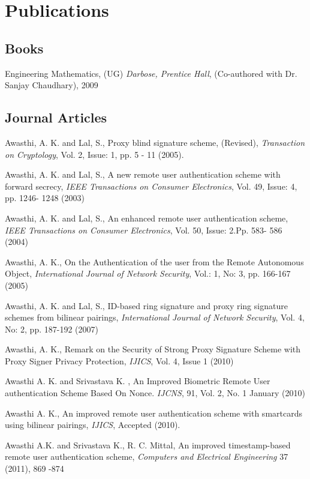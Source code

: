 \documentclass[letterpaper]{article}
\renewenvironment{itemize}{
  \begin{list}{}{
    \setlength{\leftmargin}{1.5em}
  }
}{
  \end{list}
}
\begin{document}
\section*{Publications}
\subsection*{Books}
\begin{itemize}
\item Engineering Mathematics, (UG) \emph{Darbose, Prentice Hall}, (Co-authored with Dr. Sanjay Chaudhary), 2009
\end{itemize}

\subsection*{Journal Articles}

\begin{itemize}
\item Awasthi, A. K. and Lal, S., Proxy blind signature scheme, (Revised), \emph{Transaction 
               on Cryptology}, Vol. 2, Issue:  1, pp. 5 - 11 (2005).
\item Awasthi, A. K. and Lal, S., A new remote user authentication scheme with 
              forward secrecy,  \emph{IEEE Transactions on Consumer Electronics}, Vol. 49,  Issue: 4, 
              pp. 1246- 1248 (2003)
\item Awasthi, A. K. and Lal, S., An enhanced remote user authentication scheme, 
              \emph{IEEE Transactions on Consumer Electronics}, Vol. 50,  Issue: 2.Pp. 583- 586 (2004)
\item Awasthi, A. K., On the Authentication of the user from the Remote Autonomous 
              Object, \emph{International Journal of Network Security}, Vol.: 1, No: 3, pp. 166-167 
             (2005) 
\item Awasthi, A. K. and Lal, S., ID-based ring signature and proxy ring signature 
              schemes from bilinear pairings, \emph{International Journal of Network Security}, Vol. 4, 
               No: 2, pp. 187-192 (2007)

\item Awasthi, A. K., Remark on the Security of Strong Proxy Signature Scheme with 
               Proxy Signer Privacy Protection, \emph{IJICS}, Vol. 4, Issue 1 (2010)
\item Awasthi  A.  K. and  Srivastava  K. , An Improved Biometric Remote User 
              authentication Scheme Based On Nonce.  \emph{IJCNS}, 91, Vol. 2, No. 1  January (2010)
\item Awasthi A. K., An improved remote user authentication scheme with smartcards 
               using bilinear pairings, \emph{IJICS}, Accepted (2010).
\item	Awasthi A.K. and Srivastava K., R. C. Mittal, An improved timestamp-based  remote user authentication scheme, \emph{Computers and Electrical Engineering} 37 (2011), 869 -874                                                                                                  
\end{itemize}
\end{document}
